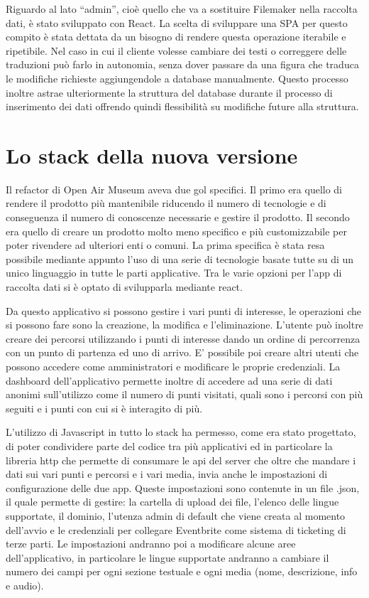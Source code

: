 Riguardo al lato “admin”, cioè quello che va a sostituire Filemaker nella raccolta dati, è stato sviluppato con React. La scelta di sviluppare una SPA per questo compito è stata dettata da un bisogno di rendere questa operazione iterabile e ripetibile. Nel caso in cui il cliente volesse cambiare dei testi o correggere delle traduzioni può farlo in autonomia, senza dover passare da una figura che traduca le modifiche richieste aggiungendole a database manualmente. Questo processo inoltre astrae ulteriormente la struttura del database durante il processo di inserimento dei dati offrendo quindi flessibilità su modifiche future alla struttura.\vspace{5mm}

\section{Lo stack della nuova versione}
Il refactor di Open Air Museum aveva due gol specifici. Il primo era quello di rendere il prodotto più mantenibile riducendo il numero di tecnologie e di conseguenza il numero di conoscenze necessarie e gestire il prodotto. Il secondo era quello di creare un prodotto molto meno specifico e più customizzabile per poter rivendere ad ulteriori enti o comuni. La prima specifica è stata resa possibile mediante appunto l’uso di una serie di tecnologie basate tutte su di un unico linguaggio in tutte le parti applicative. Tra le varie opzioni per l’app di raccolta dati si è optato di svilupparla mediante react. \vspace{5mm}

Da questo applicativo si possono gestire i vari punti di interesse, le operazioni che si possono fare sono la creazione, la modifica e l’eliminazione. L’utente può inoltre creare dei percorsi utilizzando i punti di interesse dando un ordine di percorrenza con un punto di partenza ed uno di arrivo. E’ possibile poi creare altri utenti che possono accedere come amministratori e modificare le proprie credenziali. La dashboard dell’applicativo permette inoltre di accedere ad una serie di dati anonimi sull’utilizzo come il numero di punti visitati, quali sono i percorsi con più seguiti e i punti con cui si è interagito di più.\vspace{5mm}

L’utilizzo di Javascript in tutto lo stack ha permesso, come era stato progettato, di poter condividere parte del codice tra più applicativi ed in particolare la libreria http che permette di consumare le api del server che oltre che mandare i dati sui vari punti e percorsi e i vari media, invia anche le impostazioni di configurazione delle due app. Queste impostazioni sono contenute in un file .json, il quale permette di gestire: la cartella di upload dei file, l’elenco delle lingue supportate, il dominio, l’utenza admin di default che viene creata al momento dell’avvio e le credenziali per collegare Eventbrite come sistema di ticketing di terze parti. Le impostazioni andranno poi a modificare alcune aree dell’applicativo, in particolare le lingue supportate andranno a cambiare il numero dei campi per ogni sezione testuale e ogni media (nome, descrizione, info e audio).\vspace{5mm}

